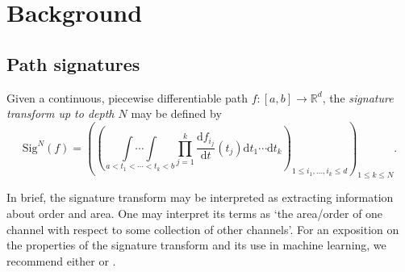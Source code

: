 \documentclass{article}
\newcommand{\reals}{\mathbb{R}}
\newcommand{\sig}{\mathrm{Sig}^N}
\newtheorem{theorem}{Theorem}
\begin{document}
\section{Background}
\subsection{Path signatures}
Given a continuous, piecewise differentiable path $f \colon [a, b] \to \reals^d$, the \emph{signature transform up to depth $N$} may be defined by
\begin{equation*}
    \sig(f)=\left(\left(\underset{\,a<t_{1}<\cdots<t_{k}<b}{\int \cdots \int} \prod_{j=1}^{k} \frac{\mathrm{d} f_{i_{j}}}{\mathrm{d} t}\left(t_{j}\right) \mathrm{d} t_{1} \cdots \mathrm{d} t_{k}\right)_{1 \leq i_{1}, \ldots, i_{k} \leq d}\right)_{1 \leq k \leq N}.
\end{equation*}



In brief, the signature transform may be interpreted as extracting information about order and area. One may interpret its terms as `the area/order of one channel with respect to some collection of other channels'. %
For an exposition on the properties of the signature transform and its use in machine learning, we recommend either \cite{primer2016} or \cite[Appendix A]{kidger2019deep}. %
\end{document}
